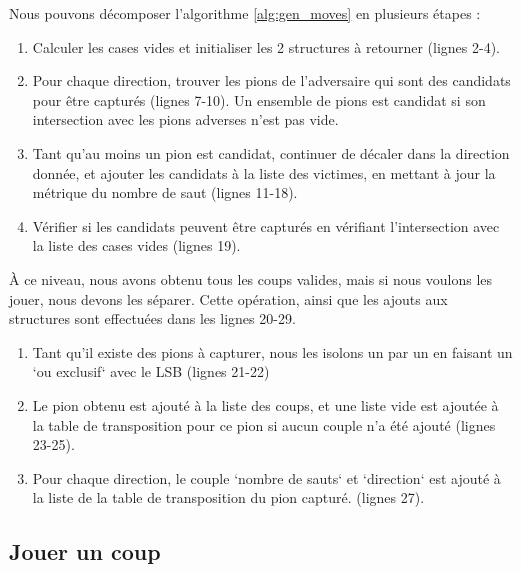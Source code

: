 Nous pouvons décomposer l'algorithme \ref{alg:gen_moves} en plusieurs étapes :
\begin{enumerate}
    \item Calculer les cases vides et initialiser les 2 structures à retourner (lignes 2-4).
    \item Pour chaque direction, trouver les pions de l'adversaire qui sont des candidats pour être capturés (lignes 7-10). Un ensemble de pions est candidat si son intersection avec les pions adverses n'est pas vide.
    \item Tant qu'au moins un pion est candidat, continuer de décaler dans la direction donnée, et ajouter les candidats à la liste des victimes, en mettant à jour la métrique du nombre de saut (lignes 11-18).
    \item Vérifier si les candidats peuvent être capturés en vérifiant l'intersection avec la liste des cases vides (lignes 19).
\end{enumerate}
À ce niveau, nous avons obtenu tous les coups valides, mais si nous voulons les jouer, nous devons les séparer. Cette opération, ainsi que les ajouts aux structures sont effectuées dans les lignes 20-29.
\begin{enumerate}
    \item Tant qu'il existe des pions à capturer, nous les isolons un par un en faisant un `ou exclusif` avec le \ac{LSB} (lignes 21-22)
    \item Le pion obtenu est ajouté à la liste des coups, et une liste vide est ajoutée à la table de transposition pour ce pion si aucun couple n'a été ajouté (lignes 23-25).
    \item Pour chaque direction, le couple `nombre de sauts` et `direction` est ajouté à la liste de la table de transposition du pion capturé. (lignes 27).
\end{enumerate}

\subsection{Jouer un coup}
\label{subsec:play}

